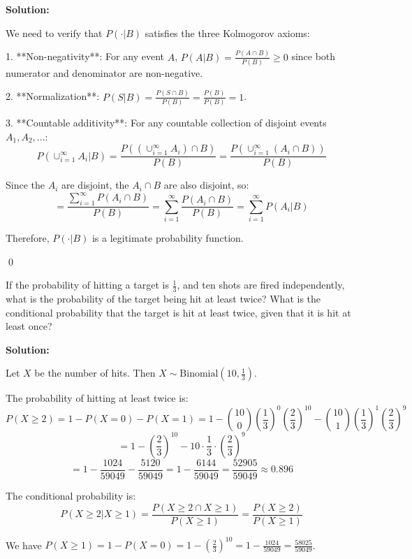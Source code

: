 \noindent\textbf{Solution:}

We need to verify that $P(\cdot|B)$ satisfies the three Kolmogorov axioms:

1. **Non-negativity**: For any event $A$, $P(A|B) = \frac{P(A \cap B)}{P(B)} \geq 0$ since both numerator and denominator are non-negative.

2. **Normalization**: $P(S|B) = \frac{P(S \cap B)}{P(B)} = \frac{P(B)}{P(B)} = 1$.

3. **Countable additivity**: For any countable collection of disjoint events $A_1, A_2, \ldots$:
   \[ P(\cup_{i=1}^{\infty} A_i|B) = \frac{P((\cup_{i=1}^{\infty} A_i) \cap B)}{P(B)} = \frac{P(\cup_{i=1}^{\infty} (A_i \cap B))}{P(B)} \]
   
   Since the $A_i$ are disjoint, the $A_i \cap B$ are also disjoint, so:
   \[ = \frac{\sum_{i=1}^{\infty} P(A_i \cap B)}{P(B)} = \sum_{i=1}^{\infty} \frac{P(A_i \cap B)}{P(B)} = \sum_{i=1}^{\infty} P(A_i|B) \]

Therefore, $P(\cdot|B)$ is a legitimate probability function.



\qed
\begin{problembox}
If the probability of hitting a target is $\frac{1}{3}$, and ten shots are fired independently, what is the probability of the target being hit at least twice? What is the conditional probability that the target is hit at least twice, given that it is hit at least once?
\end{problembox}

\noindent\textbf{Solution:}

Let $X$ be the number of hits. Then $X \sim \text{Binomial}(10, \frac{1}{3})$.

The probability of hitting at least twice is:
\[ P(X \geq 2) = 1 - P(X = 0) - P(X = 1) = 1 - \binom{10}{0}\left(\frac{1}{3}\right)^0\left(\frac{2}{3}\right)^{10} - \binom{10}{1}\left(\frac{1}{3}\right)^1\left(\frac{2}{3}\right)^9 \]
\[ = 1 - \left(\frac{2}{3}\right)^{10} - 10 \cdot \frac{1}{3} \cdot \left(\frac{2}{3}\right)^9 \]
\[ = 1 - \frac{1024}{59049} - \frac{5120}{59049} = 1 - \frac{6144}{59049} = \frac{52905}{59049} \approx 0.896 \]

The conditional probability is:
\[ P(X \geq 2|X \geq 1) = \frac{P(X \geq 2 \cap X \geq 1)}{P(X \geq 1)} = \frac{P(X \geq 2)}{P(X \geq 1)} \]

We have $P(X \geq 1) = 1 - P(X = 0) = 1 - \left(\frac{2}{3}\right)^{10} = 1 - \frac{1024}{59049} = \frac{58025}{59049}$.

